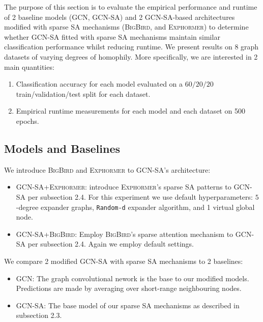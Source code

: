 The purpose of this section is to evaluate the empirical
performance and runtime of 2 baseline models
(\textsc{GCN}, \textsc{GCN-SA})
and 2 \textsc{GCN-SA}-based architectures modified
with sparse SA mechanisms 
(\textsc{BigBird}, and \textsc{Exphormer})
to determine whether \textsc{GCN-SA} fitted with sparse SA
mechanisms maintain similar classification performance
whilst reducing runtime.
We present results on $ 8 $ graph datasets of varying
degrees of homophily.
More specifically, we are interested in 2 main quantities:
\begin{enumerate}
  \item Classification accuracy for each model
    evaluated on a $ 60/20/20 $ train/validation/test
    split for each dataset.
  \item Empirical runtime measurements for each model
    and each dataset on 500 epochs.
\end{enumerate}

\subsection{Models and Baselines}
We introduce
\textsc{BigBird} and \textsc{Exphormer} to
\textsc{GCN-SA}'s architecture:

\begin{itemize}
  \item \textsc{GCN-SA+Exphormer}: introduce
  \textsc{Exphormer}'s sparse SA patterns to \textsc{GCN-SA} per subsection 2.4.
  For this experiment we use default hyperparameters:
  $ 5 $-degree expander graphs,
  \texttt{Random-d} expander algorithm,
  and 1 virtual global node.
  \item \textsc{GCN-SA+BigBird}: Employ 
  \textsc{BigBird}'s 
  sparse attention mechanism to \textsc{GCN-SA} per subsection 2.4.
  Again we employ default settings.
\end{itemize}

We compare 2 modified GCN-SA with
sparse SA mechanisms to 2 baselines:
\begin{itemize}
  \item GCN: The graph convolutional nework is the base
  to our modified models. Predictions are made by
  averaging over short-range neighbouring nodes.
  \item GCN-SA: The base model of our sparse SA mechanisms
    as described in subsection 2.3.
\end{itemize}


